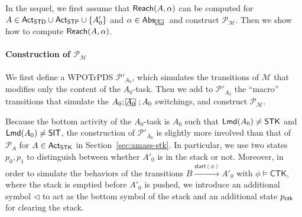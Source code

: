 \documentclass[preprint,12pt]{elsarticle}
\newcommand\rectangled[1]{\tikz[baseline=(torect.base)]{
    \node[shape = rectangle, draw, inner sep=0pt, outer sep = 0pt] (torect) {#1}
    }
}
\newcommand{\mrectangled}[1]{\text{\rectangled{\ensuremath{#1}}}}
\newcommand{\mhcancel}[1]{\mrectangled{#1}}
\newcommand\Mm{{\mathcal{M} }}
\newcommand\Pp{{\mathcal{P} }}
\newcommand\act{{\sf Act}}
\newcommand\lmd{{\sf Lmd}}
\newcommand\standard{{\sf STD}}
\newcommand\singletop{{\sf STP}}
\newcommand\singletask{{\sf STK}}
\newcommand\startactivity{{\mathsf{start} }}
\newcommand\abs{{\mathsf{Abs} }}
\newcommand\reach{{\sf Reach}}
\newcommand{\CTK}{\mathsf{CTK}}
\newcommand{\STK}{\mathsf{STK}}
\newcommand{\SIT}{\mathsf{SIT}}
\newcommand{\WOTrPDS}{\textsf{WPOTrPDS}}
\begin{document}
In the sequel, we first assume that $\reach(A, \alpha)$ can be computed for $A \in \act_\standard \cup \act_\singletop \cup \{A'_0\}$ and $\alpha \in \abs_{\mhcancel{A_0}}$ and construct $\Pp_\Mm$. Then we show how to compute $\reach(A, \alpha)$. 

\paragraph*{Construction of $\Pp_\Mm$} 
We first define a {\WOTrPDS} $\Pp'_{A_0}$, which simulates the transitions of $\Mm$ that modifies only the content of the $A_0$-task. Then we add to $\Pp'_{A_0}$ the ``macro'' transitions that simulate the $A_0;\mhcancel{A_0};A_0$ switchings, and construct $\Pp_\Mm$.  

Because the bottom activity of the $A_0$-task is $A_0$ such that $\lmd(A_0) \neq \STK$ and $\lmd(A_0) \neq \SIT$, the construction of $\Pp'_{A_0}$ is slightly more involved than that of $\Pp_A$ for $A \in \act_\singletask$ in Section~\ref{sec:amass-stk}. In particular, we use two states $p_0, p_1$ to distinguish between whether $A'_0$ is in the stack or not. Moreover, in order to simulate the behaviors of the transitions $B \xrightarrow{\startactivity(\phi)} A'_0$ with $\phi \models \CTK$, where the stack is emptied before $A'_0$ is pushed, we introduce an additional symbol $\triangleleft$ to act as the bottom symbol of the stack and an additional state $p_{\sf ctk}$ for clearing the stack. 
\end{document}
